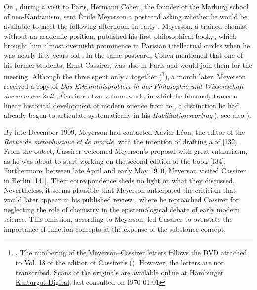 \documentclass[submitted,12pt]{article}
\begin{document}
On , during a visit to Paris, Hermann Cohen, the founder of the Marburg school of neo-Kantianism, sent Émile Meyerson a postcard asking whether he would be available to meet the following afternoon. In early \citeyear{Meyerson1908}, Meyerson, a trained chemist without an academic position, published his first philosophical book, \IRt, which brought him almost overnight prominence in Parisian intellectual circles when he was nearly fifty years old \citep{Laclos2009a}. In the same postcard, Cohen mentioned that one of his former students, Ernst Cassirer, was also in Paris and would join them for the meeting. Although the three spent only a  together (\footnote{\cite[]{ECN}. The numbering of the Meyerson--Cassirer letters follows the DVD attached to Vol. 18 of the edition of Cassirer's  (\cite{ECN}). However, the letters are not transcribed. Scans of the originals are available online at
\href{https://digitalisate.sub.uni-hamburg.de/recherche?tx_dlf_listview\%5Baction\%5D=main&tx_dlf_listview\%5Bcontroller\%5D=ListView&tx_dlf_listview\%5Bpage\%5D=1&tx_dlf_listview\%5Bsearch\%5D\%5Border\%5D=&tx_dlf_listview\%5Bsearch\%5D\%5BorderBy\%5D=&tx_dlf_listview\%5Bsearch\%5D\%5Bquery\%5D=Meyerson&cHash=0d009ea45cd8a5124ca05a24b99420c9}{Hamburger Kulturgut Digital}; last consulted on \today}), a month later, Meyerson received a copy of \emph{Das Erkenntnisproblem in der Philosophie und Wissenschaft der neueren Zeit} \citep{Cassirer1906a,Cassirer1907b}, Cassirer’s two-volume work, in which he famously traces a linear historical development of modern science from \SCs to \FCs, a distinction he had already begun to articulate systematically in his \emph{Habilitationsvortrag} (\cite{Cassirer1907}; see also \cite{Cassirer1907a}).

By late December 1909, Meyerson had contacted Xavier Léon, the editor of the \emph{Revue de métaphysique et de morale}, with the intention of drafting a  of \EPt {}[132]. From the outset, Cassirer welcomed Meyerson’s proposal with great enthusiasm, as he was about to start working on the second edition of the book [134]. Furthermore, between late April and early May 1910, Meyerson visited Cassirer in Berlin [141]. Their correspondence sheds no light on what they discussed. Nevertheless, it seems plausible that Meyerson anticipated the criticism that would later appear in his published review \citep{Meyerson1911}, where he reproached Cassirer for neglecting the role of chemistry in the epistemological debate of early modern science. This omission, according to Meyerson, led Cassirer to overstate the importance of function-concepts at the expense of the substance-concept.
\end{document}
